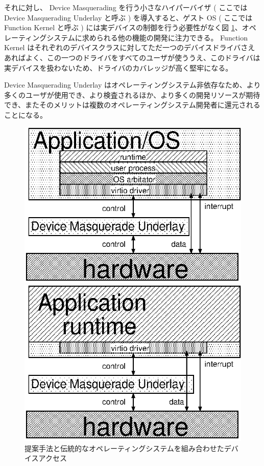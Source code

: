\documentclass[a4paper,11pt,report]{ltjsbook}
\begin{document}
それに対し、 Device Masquerading を行う小さなハイパーバイザ ( ここでは Device Masquerading Underlay と呼ぶ ) を導入すると、ゲスト OS ( ここでは Function Kernel と呼ぶ ) には実デバイスの制御を行う必要性がなく図 \ref{underlayarch}、オペレーティングシステムに求められる他の機能の開発に注力できる。 Function Kernel はそれぞれのデバイスクラスに対してただ一つのデバイスドライバさえあればよく、この一つのドライバをすべてのユーザが使ううえ、このドライバは実デバイスを扱わないため、ドライバのカバレッジが高く堅牢になる。%

Device Masquerading Underlay はオペレーティングシステム非依存なため、より多くのユーザが使用でき、より検査されるほか、より多くの開発リソースが期待でき、またそのメリットは複数のオペレーティングシステム開発者に還元されることになる。

\begin{figure}[htbp]
  \begin{minipage}{0.5\hsize}
  \begin{center}
    \includegraphics[width=\textwidth]{./underlay.eps}
    \caption{提案手法と伝統的なオペレーティングシステムを組み合わせたデバイスアクセス}
    \label{underlayarch}
  \end{center}
  \end{minipage}
  \begin{minipage}{0.5\hsize}
  \begin{center}
    \includegraphics[width=\textwidth]{./underlay_unikernel.eps}

\end{center}
\end{minipage}
\end{figure}
\end{document}
